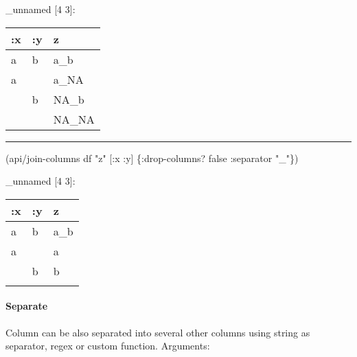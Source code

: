\documentclass[]{article}
\newenvironment{Shaded}{\begin{snugshade}}{\end{snugshade}}
\newcommand{\AttributeTok}[1]{\textcolor[rgb]{0.77,0.63,0.00}{#1}}
\newcommand{\NormalTok}[1]{#1}
\newcommand{\StringTok}[1]{\textcolor[rgb]{0.31,0.60,0.02}{#1}}
\newcommand{\VariableTok}[1]{\textcolor[rgb]{0.00,0.00,0.00}{#1}}
\let\oldparagraph\paragraph
\renewcommand{\paragraph}[1]{\oldparagraph{#1}\mbox{}}
\begin{document}
\_unnamed {[}4 3{]}:

\begin{longtable}[]{@{}lll@{}}
\toprule
:x & :y & z\tabularnewline
\midrule
\endhead
a & b & a\_b\tabularnewline
a & & a\_NA\tabularnewline
& b & NA\_b\tabularnewline
& & NA\_NA\tabularnewline
\bottomrule
\end{longtable}

\begin{center}\rule{0.5\linewidth}{0.5pt}\end{center}

\begin{Shaded}
\begin{Highlighting}[]
\NormalTok{(api/join-columns df }\StringTok{"z"}\NormalTok{ [}\AttributeTok{:x} \AttributeTok{:y}\NormalTok{] \{}\AttributeTok{:drop-columns}\NormalTok{? }\VariableTok{false}
                                  \AttributeTok{:separator} \StringTok{"_"}\NormalTok{\})}
\end{Highlighting}
\end{Shaded}

\_unnamed {[}4 3{]}:

\begin{longtable}[]{@{}lll@{}}
\toprule
:x & :y & z\tabularnewline
\midrule
\endhead
a & b & a\_b\tabularnewline
a & & a\tabularnewline
& b & b\tabularnewline
& &\tabularnewline
\bottomrule
\end{longtable}

\hypertarget{separate}{%
\paragraph{Separate}\label{separate}}

Column can be also separated into several other columns using string as
separator, regex or custom function. Arguments:
\end{document}
